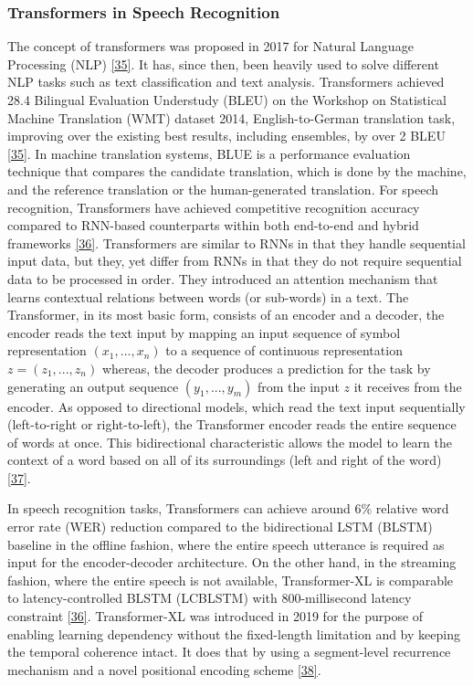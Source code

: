 \documentclass[
  a4paper,
]{article}
\begin{document}
\subsubsection{Transformers in Speech Recognition}  
\label{section:transformers}

The concept of transformers was proposed in 2017 for Natural Language
Processing (NLP) \protect\hyperlink{ref-vaswani2017attention}{{[}35{]}}.
It has, since then, been heavily used to solve different NLP tasks such
as text classification and text analysis. Transformers achieved 28.4
Bilingual Evaluation Understudy (BLEU) on the Workshop on Statistical
Machine Translation (WMT) dataset 2014, English-to-German translation
task, improving over the existing best results, including ensembles, by
over 2 BLEU \protect\hyperlink{ref-vaswani2017attention}{{[}35{]}}. In
machine translation systems, BLUE is a performance evaluation technique
that compares the candidate translation, which is done by the machine,
and the reference translation or the human-generated translation. For
speech recognition, Transformers have achieved competitive recognition
accuracy compared to RNN-based counterparts within both end-to-end and
hybrid frameworks \protect\hyperlink{ref-lu2020exploring}{{[}36{]}}.
Transformers are similar to RNNs in that they handle sequential input
data, but they, yet differ from RNNs in that they do not require
sequential data to be processed in order. They introduced an attention
mechanism that learns contextual relations between words (or sub-words)
in a text. The Transformer, in its most basic form, consists of an
encoder and a decoder, the encoder reads the text input by mapping an
input sequence of symbol representation \((x_1,...,x_n)\) to a sequence
of continuous representation \(z = (z_1,...,z_n)\) whereas, the decoder
produces a prediction for the task by generating an output sequence
\((y_1, ...,y_m)\) from the input \(z\) it receives from the encoder. As
opposed to directional models, which read the text input sequentially
(left-to-right or right-to-left), the Transformer encoder reads the
entire sequence of words at once. This bidirectional characteristic
allows the model to learn the context of a word based on all of its
surroundings (left and right of the word)
\protect\hyperlink{ref-towardsdatasience}{{[}37{]}}.

In speech recognition tasks, Transformers can achieve around 6\%
relative word error rate (WER) reduction compared to the bidirectional
LSTM (BLSTM) baseline in the offline fashion, where the entire speech
utterance is required as input for the encoder-decoder architecture. On
the other hand, in the streaming fashion, where the entire speech is not
available, Transformer-XL is comparable to latency-controlled BLSTM
(LCBLSTM) with 800-millisecond latency constraint
\protect\hyperlink{ref-lu2020exploring}{{[}36{]}}. Transformer-XL was
introduced in 2019 for the purpose of enabling learning dependency
without the fixed-length limitation and by keeping the temporal
coherence intact. It does that by using a segment-level recurrence
mechanism and a novel positional encoding scheme
\protect\hyperlink{ref-dai2019transformerxl}{{[}38{]}}.
\end{document}
